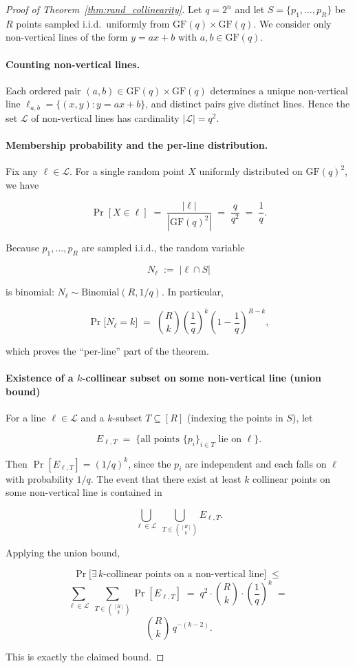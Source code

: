 \documentclass[10pt,a4paper]{amsart}
\newcommand{\GF}{\mathrm{GF}}
\newcommand{\cL}{\mathcal{L}}
\newcommand{\defeq}{:=}
\begin{document}
\begin{proof}[Proof of Theorem~\ref{thm:rand_collinearity}]
Let $q=2^n$ and let $S=\{p_1,\ldots,p_R\}$ be $R$ points sampled i.i.d.\ uniformly from $\GF(q)\times\GF(q)$. We consider only non-vertical lines of the form $y=ax+b$ with $a,b\in\GF(q)$.

\paragraph{Counting non-vertical lines.}
Each ordered pair $(a,b)\in\GF(q)\times\GF(q)$ determines a unique non-vertical line $\ell_{a,b}=\{(x,y): y=ax+b\}$, and distinct pairs give distinct lines. Hence the set $\mathcal{L}$ of non-vertical lines has cardinality $|\mathcal{L}|=q^2$.

\paragraph{Membership probability and the per-line distribution.}
Fix any $\ell\in\cL$. For a single random point $X$ uniformly distributed on $\GF(q)^2$, we have

\[
    \Pr[X\in \ell] \;=\; \frac{|\ell|}{|\GF(q)^2|} \;=\; \frac{q}{q^2} \;=\; \frac{1}{q}.
\]

Because $p_1,\ldots,p_R$ are sampled i.i.d., the random variable

\[
    N_\ell \;\defeq\; |\ell \cap S|
\]

is binomial: $N_\ell \sim \mathrm{Binomial}(R,1/q)$. In particular,

\[
    \Pr\!\big[N_\ell = k\big] \;=\; \binom{R}{k}\left(\frac{1}{q}\right)^k\!\left(1-\frac{1}{q}\right)^{R-k},
\]

which proves the ``per-line'' part of the theorem.

\paragraph{Existence of a $k$-collinear subset on some non-vertical line (union bound)}
For a line $\ell\in\cL$ and a $k$-subset $T\subseteq [R]$ (indexing the points in $S$), let

\[
    E_{\ell,T}\;=\;\{\text{all points } \{p_i\}_{i\in T} \text{ lie on } \ell\}.
\]

Then $\Pr[E_{\ell,T}] = (1/q)^k$, since the $p_i$ are independent and each falls on $\ell$ with probability $1/q$. The event that there exist at least $k$ collinear points on some non-vertical line is contained in

\[
    \bigcup_{\ell\in\cL}\;\bigcup_{T\in \binom{[R]}{k}} E_{\ell,T}.
\]

Applying the union bound,

\[
    \Pr\!\big[\exists\, k\text{-collinear points on a non-vertical line}\big]
    \;\le\;
\]
\noindent
\[
    \sum_{\ell\in\cL}\;\sum_{T\in \binom{[R]}{k}} \Pr[E_{\ell,T}]
    \;=\;
    q^2\cdot \binom{R}{k}\cdot \left(\frac{1}{q}\right)^{k}
    \;=\;
\]
\noindent
\[
    \binom{R}{k}\, q^{-(k-2)}.
\]

This is exactly the claimed bound.

\end{proof}
\end{document}

